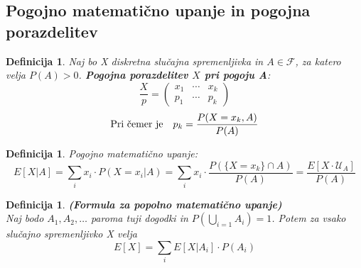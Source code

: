 \documentclass[11pt]{article}
\newtheorem{Definicija}[Izrek]{{\sc Definicija}}
\begin{document}
	\subsection{Pogojno matematično upanje in pogojna porazdelitev}
	\begin{Definicija}
		Naj bo X diskretna slučajna spremenljivka in $A\in \mathcal{F}$, za katero velja $P(A) >0$.\textbf{ Pogojna porazdelitev $X$ pri pogoju A}:
		\[
		\frac{X}{p} = \begin{pmatrix}
		x_1 & \cdots & x_k \\       p_1 & \cdots & p_k
		\end{pmatrix}
		\]
		$$\textnormal{Pri čemer je}\quad p_k= \frac{P(X = x_k , A)}{P(A)}$$
	\end{Definicija}
	
	\begin{Definicija}
		Pogojno matematično upanje:
		$$E[X|A] = \sum_{i}{x_i \cdot P(X=x_i|A)} = \sum_{i}{x_i \cdot \frac{P(\{X =x_k\} \cap A)}{P(A)}} = \frac{E[X\cdot \mathcal{U}_A]}{P(A)}$$
	\end{Definicija}
	\begin{Definicija}
		\textbf{(Formula za popolno matematično upanje)} \\
		Naj bodo $A_1,A_2, \dotsc$ paroma tuji dogodki in $P(\bigcup_{i=1}A_i) = 1$. Potem za vsako slučajno spremenljivko X velja $$E[X] = \sum_{i}E[X|A_i] \cdot P(A_i)$$ 
	\end{Definicija}
\end{document}
